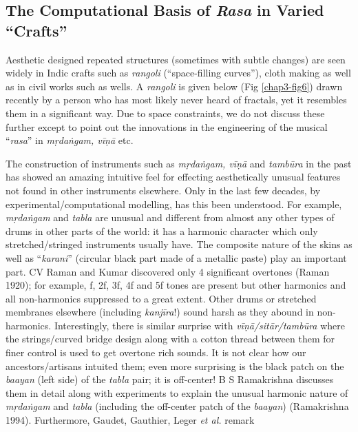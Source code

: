 \subsection{The Computational Basis of \textsl{Rasa} in Varied “Crafts”}\label{chap3-sec5.4}

Aesthetic designed repeated structures (sometimes with subtle changes) are seen widely in Indic crafts such as \textsl{rangoli} (“space-filling curves”), cloth making as well as in civil works such as wells. A \textsl{rangoli} is given below (Fig \ref{chap3-fig6}) drawn recently by a person who has most likely never heard of fractals, yet it resembles them in a significant way. Due to space constraints, we do not discuss these further except to point out the innovations in the engineering of the musical “\textsl{rasa}” in \textsl{mṛdaṅgam, vīṇā} etc.

The construction of instruments such as \textsl{mṛdaṅgam, vīṇā} and \textsl{tambūra} in the past has showed an amazing intuitive feel for effecting aesthetically unusual features not found in other instruments elsewhere. Only in the last few decades, by experimental/computational modelling, has this been understood. For example, \textsl{mṛdaṅgam} and \textsl{tabla} are unusual and different from almost any other types of drums in other parts of the world: it has a harmonic character which only stretched/\-stringed instruments usually have. The composite nature of the skins as well as “\textsl{karani}” (circular black part made of a metallic paste) play an important part.  CV Raman and Kumar discovered only 4 significant overtones (Raman 1920); for example, f, 2f, 3f, 4f and 5f tones are present but other harmonics and all non-harmonics suppressed to a great extent. Other drums or stretched membranes elsewhere (including \textsl{kanjīra}!) sound harsh as they abound in non-harmonics. Interestingly, there is similar surprise with \textsl{vīṇā/sitār/tambūra} where the strings/curved bridge design along with a cotton thread between them for finer control is used to get overtone rich sounds. It is not clear how our ancestors/artisans intuited them; even more surprising is the black patch on the \textsl{baayan} (left side) of the \textsl{tabla} pair; it is off-center! B S Ramakrishna discusses them in detail along with experiments to explain the unusual harmonic nature of \textsl{mṛdaṅgam} and \textsl{tabla} (including the off-center patch of the \textsl{baayan}) (Ramakrishna 1994). Furthermore, Gaudet, Gauthier, Leger \textsl{et al.} remark 

